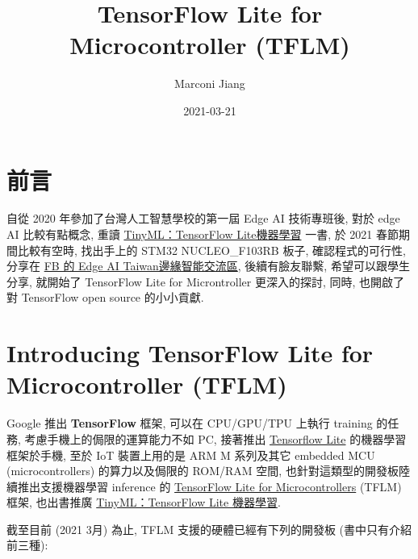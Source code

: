 \documentclass[
]{book}
\title{TensorFlow Lite for Microcontroller (TFLM)}
\author{Marconi Jiang}
\date{2021-03-21}
\begin{document}
\maketitle

{
\setcounter{tocdepth}{1}
\tableofcontents
}
\hypertarget{ux524dux8a00}{%
\chapter{前言}\label{ux524dux8a00}}

自從 2020 年參加了台灣人工智慧學校的第一屆 Edge AI 技術專班後, 對於 edge AI 比較有點概念, 重讀 \href{https://www.books.com.tw/products/0010865580?fbclid=IwAR1xgb-0LStRrHXajKT-u3uP982d0p8PQaDpNfhxHAzuCbATi6VOjYcwo2k}{TinyML：TensorFlow Lite機器學習} 一書, 於 2021 春節期間比較有空時, 找出手上的 STM32 NUCLEO\_F103RB 板子, 確認程式的可行性, 分享在 \href{https://www.facebook.com/groups/edgeaitw/permalink/2841368276150520/}{FB 的 Edge AI Taiwan邊緣智能交流區}, 後續有臉友聯繫, 希望可以跟學生分享, 就開始了 TensorFlow Lite for Microntroller 更深入的探討, 同時, 也開啟了對 TensorFlow open source 的小小貢獻.

\hypertarget{chap-intro}{%
\chapter{Introducing TensorFlow Lite for Microcontroller (TFLM)}\label{chap-intro}}

Google 推出 \textbf{TensorFlow} 框架, 可以在 CPU/GPU/TPU 上執行 training 的任務, 考慮手機上的侷限的運算能力不如 PC, 接著推出 \href{https://www.tensorflow.org/lite/tutorials}{Tensorflow Lite} 的機器學習框架於手機, 至於 IoT 裝置上用的是 ARM M 系列及其它 embedded MCU (microcontrollers) 的算力以及侷限的 ROM/RAM 空間, 也針對這類型的開發板陸續推出支援機器學習 inference 的 \href{https://www.tensorflow.org/lite/microcontrollers}{TensorFlow Lite for Microcontrollers} (TFLM) 框架, 也出書推廣
\href{https://www.books.com.tw/products/0010865580?fbclid=IwAR1xgb-0LStRrHXajKT-u3uP982d0p8PQaDpNfhxHAzuCbATi6VOjYcwo2k}{TinyML：TensorFlow Lite 機器學習}.

截至目前 (2021 3月) 為止, TFLM 支援的硬體已經有下列的開發板 (書中只有介紹前三種):
\end{document}

